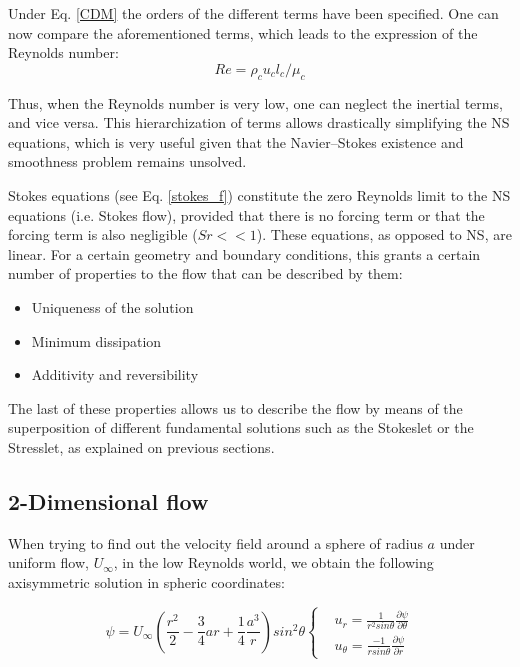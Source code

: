 Under Eq. \ref{CDM} the orders of the different terms have been specified. One can now compare the aforementioned terms, which leads to the expression of the Reynolds number:
\begin{equation}
	Re = \rho_c u_c l_c/\mu_c
\end{equation}

Thus, when the Reynolds number is very low, one can neglect the inertial terms, and vice versa. This hierarchization of terms allows drastically simplifying the NS equations, which is very useful given that the Navier–Stokes existence and smoothness problem remains unsolved.

Stokes equations (see Eq. \ref{stokes_f}) constitute the zero Reynolds limit to the NS equations (i.e. Stokes flow), provided that there is no forcing term or that the forcing term is also negligible ($Sr<<1$). These equations, as opposed to NS, are linear. For a certain geometry and boundary conditions, this grants a certain number of properties to the flow that can be described by them:

\begin{itemize}
	\item Uniqueness of the solution  
	\item Minimum dissipation
	\item Additivity and reversibility
\end{itemize}

The last of these properties allows us to describe the flow by means of the superposition of different fundamental solutions such as the Stokeslet or the Stresslet, as explained on previous sections.

\subsection{2-Dimensional flow}
\label{2dflow}

When trying to find out the velocity field around a sphere of radius $a$ under uniform flow, $U_\infty$, in the low Reynolds world, we obtain the following axisymmetric solution in spheric coordinates:

\begin{equation}
\psi = U_\infty \left(\frac{r^2}{2} - \frac{3}{4}ar + \frac{1}{4} \frac{a^3}{r} \right) sin ^2 \theta
\left\{
\begin{aligned}
& u_r = \frac{1}{r^2 sin \theta} \frac{\partial \psi}{\partial \theta}\\
& u_\theta = \frac{-1}{r sin \theta} \frac{\partial \psi}{\partial r}
\end{aligned}
\right.
\end{equation}

